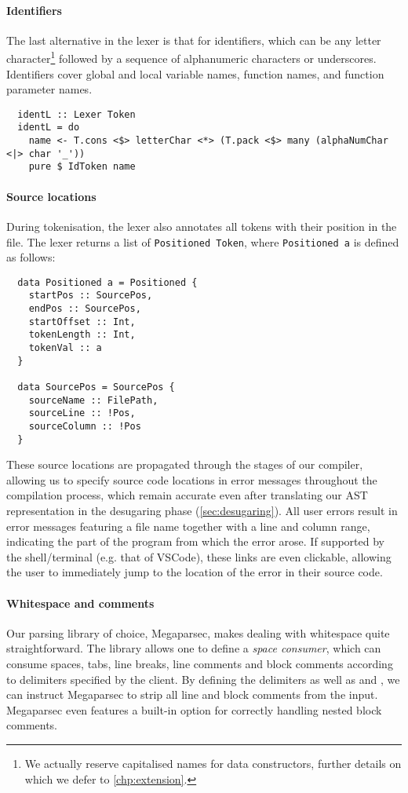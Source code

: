 \paragraph{Identifiers}
The last alternative in the lexer is that for identifiers, which can be any
letter character\footnote{We actually reserve capitalised names for data
constructors, further details on which we defer to \cref{chp:extension}.}
followed by a sequence of alphanumeric characters or underscores.
Identifiers cover global and local variable names, function names, and
function parameter names.

\begin{verbatim}
  identL :: Lexer Token
  identL = do
    name <- T.cons <$> letterChar <*> (T.pack <$> many (alphaNumChar <|> char '_'))
    pure $ IdToken name
\end{verbatim}


\paragraph{Source locations}
During tokenisation, the lexer also annotates all tokens with their position in
the file. The lexer returns a list of \texttt{Positioned Token},
where \texttt{Positioned a} is defined as follows:
%
\begin{verbatim}
  data Positioned a = Positioned {
    startPos :: SourcePos,
    endPos :: SourcePos,
    startOffset :: Int,
    tokenLength :: Int,
    tokenVal :: a
  }

  data SourcePos = SourcePos {
    sourceName :: FilePath,
    sourceLine :: !Pos,
    sourceColumn :: !Pos
  }
\end{verbatim}

These source locations are propagated through the stages of our compiler,
allowing us to specify source code locations in error messages throughout the
compilation process, which remain accurate even after translating our AST
representation in the desugaring phase (\cref{sec:desugaring}).
%
All user errors result in error messages featuring a file name together with a
line and column range, indicating the part of the program from which the error
arose. If supported by the shell/terminal (e.g. that of VSCode), these links are
even clickable, allowing the user to immediately jump to the location of the
error in their source code.

\paragraph{Whitespace and comments}
Our parsing library of choice, Megaparsec, makes dealing with whitespace quite
straightforward. The library allows one to define a \emph{space consumer}, which
can consume spaces, tabs, line breaks, line comments and block comments
according to delimiters specified by the client.
By defining the delimiters \code{//} as well as \code{/*} and \code{*/}, we can
instruct Megaparsec to strip all line and block comments from the input.
Megaparsec even features a built-in option for correctly
handling nested block comments.

